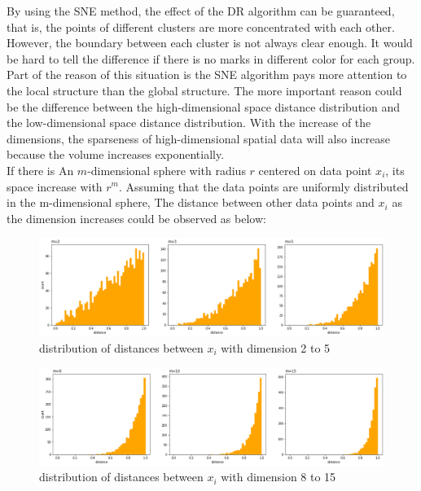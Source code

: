 By using the SNE method, the effect of the DR algorithm can be guaranteed, that is, the points of different clusters are more concentrated with each other. However, the boundary between each cluster is not always clear enough. It would be hard to tell the difference if there is no marks in different color for each group.\\  

\noindent Part of the reason of this situation is the SNE algorithm pays more attention to the local structure than the global structure. The more important reason could be the difference between the high-dimensional space distance distribution and the low-dimensional space distance distribution. With the increase of the dimensions, the sparseness of high-dimensional spatial data will also increase because the volume increases exponentially.\\

\noindent If there is An $m$-dimensional sphere with radius $r$ centered on data point $x_i$, its space increase with $r^m$. Assuming that the data points are uniformly distributed in the m-dimensional sphere, The distance between other data points and $x_i$ as the dimension increases could be observed as below:

\begin{figure}[ht]

\centering
\includegraphics[scale=0.34]{images/image_crowding_problem_1.png}
\caption{distribution of distances between $x_i$ with dimension 2 to 5}
\label{fig:label}
\end{figure}

\begin{figure}[ht]

\centering
\includegraphics[scale=0.34]{images/image_crowding_problem_2.png}
\caption{distribution of distances between $x_i$ with dimension 8 to 15}
\label{fig:label}
\end{figure}

